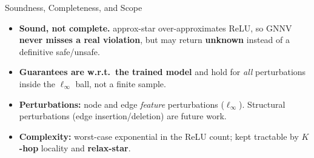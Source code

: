 \documentclass[11pt,aspectratio=169,t]{beamer}
\newcommand{\good}[1]{\textbf{\textcolor{safegreen}{#1}}}
\newcommand{\key}[1]{\textbf{\textcolor{VUgoldDark}{#1}}}
\begin{document}
\begin{frame}[noframenumbering]{Soundness, Completeness, and Scope}
  \begin{itemize}\itemsep=1.3ex
    \item \textbf{Sound, not complete.} approx-star over-approximates ReLU, so GNNV
          \good{never misses a real violation}, but may return
          \textcolor{amber}{\textbf{unknown}} instead of a definitive safe/unsafe.
    \item \textbf{Guarantees are w.r.t.\ the trained model} and hold for \emph{all}
          perturbations inside the $\ell_\infty$ ball, not a finite sample.
    \item \textbf{Perturbations:} node and edge \emph{feature} perturbations ($\ell_\infty$).
          Structural perturbations (edge insertion/deletion) are future work.
    \item \textbf{Complexity:} worst-case exponential in the ReLU count; kept tractable
          by \key{$K$-hop} locality and \key{relax-star}.
  \end{itemize}
\end{frame}
\end{document}
